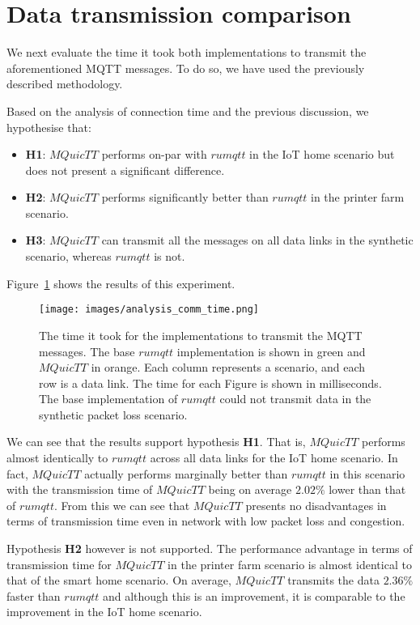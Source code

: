 \section{Data transmission comparison}

We next evaluate the time it took both implementations to transmit the aforementioned MQTT messages.
To do so, we have used the previously described methodology.

Based on the analysis of connection time and the previous discussion, we hypothesise that:

\begin{itemize}
    \item \textbf{H1}: $MQuicTT$ performs on-par with $rumqtt$ in the IoT home scenario but does not present a significant difference.
    \item \textbf{H2}: $MQuicTT$ performs significantly better than $rumqtt$ in the printer farm scenario.
    \item \textbf{H3}: $MQuicTT$ can transmit all the messages on all data links in the synthetic scenario, whereas $rumqtt$ is not.
\end{itemize}

Figure~\ref{fig:comm_time} shows the results of this experiment.

\begin{figure}[ht]
    \centering
    \texttt{[image: images/analysis\_comm\_time.png]}
    \caption{The time it took for the implementations to transmit the MQTT messages.
        The base $rumqtt$ implementation is shown in green and $MQuicTT$ in orange.
        Each column represents a scenario, and each row is a data link.
        The time for each Figure is shown in milliseconds. The base implementation of $rumqtt$ could not transmit data in the synthetic packet loss scenario.}
    \label{fig:comm_time}
\end{figure}

We can see that the results support hypothesis \textbf{H1}.
That is,  $MQuicTT$ performs almost identically to $rumqtt$ across all data links for the IoT home scenario.
In fact, $MQuicTT$ actually performs marginally better than $rumqtt$ in this scenario with the transmission time of $MQuicTT$ being on average $2.02\%$ lower than that of $rumqtt$.
From this we can see that $MQuicTT$ presents no disadvantages in terms of transmission time even in network with low packet loss and congestion.

Hypothesis \textbf{H2} however is not supported.
The performance advantage in terms of transmission time for $MQuicTT$ in the printer farm scenario is almost identical to that of the smart home scenario.
On average, $MQuicTT$ transmits the data $2.36\%$ faster than $rumqtt$ and although this is an improvement, it is comparable to the improvement in the IoT home scenario.

